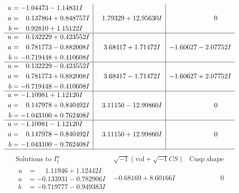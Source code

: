 \documentclass[1p]{elsarticle_modified}
\theoremstyle{definition}
\newcommand{\I}{\sqrt{-1}}
\begin{document}
$$\begin{array}{c|c|c}
\begin{aligned}
u &= -1.04473 - 1.14831 I \\
a &= \phantom{-}0.137864 + 0.848757 I \\
b &= \phantom{-}0.92810 + 1.15122 I\end{aligned}
 & \phantom{-}1.79329 + 12.95630 I & \phantom{-0.000000 } 0 \\ \hline\begin{aligned}
u &= \phantom{-}0.132229 + 0.423552 I \\
a &= \phantom{-}0.781773 - 0.882008 I \\
b &= -0.719448 + 0.410608 I\end{aligned}
 & \phantom{-}3.68417 + 1.71472 I & -1.60627 - 2.07752 I \\ \hline\begin{aligned}
u &= \phantom{-}0.132229 - 0.423552 I \\
a &= \phantom{-}0.781773 + 0.882008 I \\
b &= -0.719448 - 0.410608 I\end{aligned}
 & \phantom{-}3.68417 - 1.71472 I & -1.60627 + 2.07752 I \\ \hline\begin{aligned}
u &= -1.10981 + 1.12120 I \\
a &= \phantom{-}0.147978 + 0.840492 I \\
b &= -1.043100 + 0.762408 I\end{aligned}
 & \phantom{-}3.11150 - 12.99860 I & \phantom{-0.000000 } 0 \\ \hline\begin{aligned}
u &= -1.10981 - 1.12120 I \\
a &= \phantom{-}0.147978 - 0.840492 I \\
b &= -1.043100 - 0.762408 I\end{aligned}
 & \phantom{-}3.11150 + 12.99860 I & \phantom{-0.000000 } 0\\
 \hline 
 \end{array}$$\newpage$$\begin{array}{c|c|c}  
\text{Solutions to }I^u_{1}& \I (\text{vol} + \sqrt{-1}CS) & \text{Cusp shape}\\
 \hline 
\begin{aligned}
u &= \phantom{-}1.11946 + 1.12442 I \\
a &= -0.133931 - 0.782906 I \\
b &= -0.719777 - 0.949383 I\end{aligned}
 & -0.68169 + 8.60166 I & \phantom{-0.000000 } 0 \\ \hline\begin{aligned}

\end{aligned}
\end{array}$$
\end{document}
